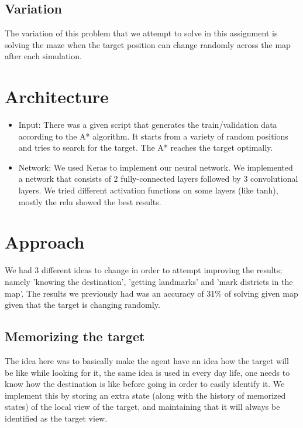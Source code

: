 \documentclass[a4paper]{article}
\begin{document}
\subsection{Variation}
The variation of this problem that we attempt to solve in this assignment is solving the maze when the target position can change randomly across the map after each simulation.

\section{Architecture}
\begin{itemize}
\item Input: There was a given script that generates the train/validation data according to the A* algorithm. It starts from a variety of random positions and tries to search for the target. The A* reaches the target optimally.

\item Network: We used Keras to implement our neural network. We implemented a network that consists of 2 fully-connected layers followed by 3 convolutional layers. We tried different activation functions on some layers (like tanh), mostly the relu showed the best results.
\end{itemize}

\section{Approach}
We had 3 different ideas to change in order to attempt improving the results; namely 'knowing the destination', 'getting landmarks' and 'mark districts in the map'. The results we previously had was an accuracy of 31\% of solving given map given that the target is changing randomly.
\subsection{Memorizing the target}
The idea here was to basically make the agent have an idea how the target will be like while looking for it, the same idea is used in every day life, one needs to know how the destination is like before going in order to easily identify it.
We implement this by storing an extra state (along with the history of memorized states) of the local view of the target, and maintaining that it will always be identified as the target view.
\end{document}

